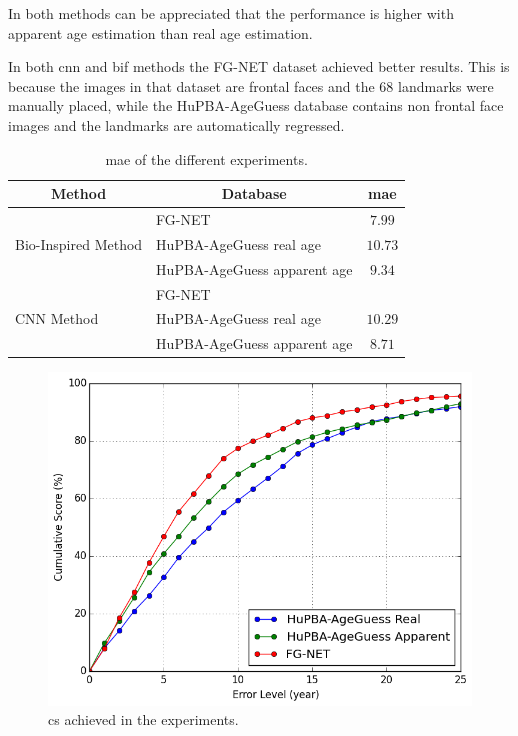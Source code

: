 In both methods can be appreciated that the performance is higher with apparent age estimation than real age estimation. 

In both \gls{cnn} and \gls{bif} methods the FG-NET dataset achieved better results. This is because the images in that dataset are frontal faces and the 68 landmarks were manually placed, while the HuPBA-AgeGuess database contains non frontal face images and the landmarks are automatically regressed.

\begin{table}[!h]
	\centering
	\begin{tabular}{|l|l|c|}
		\hline
		\multicolumn{1}{|c|}{\textbf{Method}} & 
		\multicolumn{1}{|c|}{\textbf{Database}} & \textbf{\gls{mae}}\\ \hline\hline%
		\multirow{3}{*}{Bio-Inspired Method} & FG-NET & $7.99$\\ 		\cline{2-3} 
				& HuPBA-AgeGuess real age & $10.73$\\ \cline{2-3}
				& HuPBA-AgeGuess apparent age & $9.34$\\ \hline\hline%
		\multirow{3}{*}{CNN Method} & FG-NET & \\ \cline{2-3}
				& HuPBA-AgeGuess real age & $10.29$\\ \cline{2-3}
			
				& HuPBA-AgeGuess apparent age & $8.71$ \\ \hline
		
		
	\end{tabular}
	\caption{\gls{mae} of the different experiments.}
	\label{tab:results}
\end{table}

\begin{figure}[!h]
	\centering
	\includegraphics[width=\textwidth]{figures/cum_score}
	\caption{\gls{cs} achieved in the experiments.}
	\label{fig:cumS}
\end{figure}
